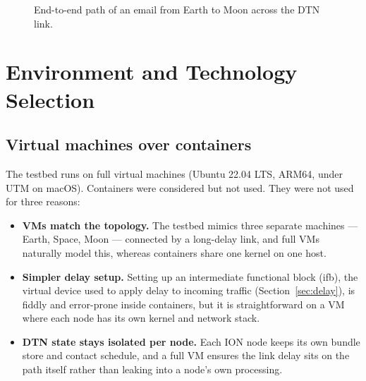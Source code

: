 \begin{figure}[H]
\centering
{}
\caption{End-to-end path of an email from Earth to Moon across the DTN link.}
\label{fig:dataflow}
\end{figure}

\section{Environment and Technology Selection}
\label{sec:env}

\subsection{Virtual machines over containers}
The testbed runs on full virtual machines (Ubuntu 22.04 LTS, ARM64, under UTM on macOS). Containers were considered but not used. They were not used for three reasons:

\begin{itemize}
   \item \textbf{VMs match the topology.} The testbed mimics three separate machines — Earth, Space, Moon — connected by a long-delay link, and full VMs naturally model this, whereas containers share one kernel on one host.
  \item \textbf{Simpler delay setup.} Setting up an intermediate functional block (ifb), the virtual device used to apply delay to incoming traffic (Section~\ref{sec:delay}), is fiddly and error-prone inside containers, but it is straightforward on a VM where each node has its own kernel and network stack.
  \item \textbf{DTN state stays isolated per node.} Each ION node keeps its own bundle store and contact schedule, and a full VM ensures the link delay sits on the path itself rather than leaking into a node's own processing.
\end{itemize}

